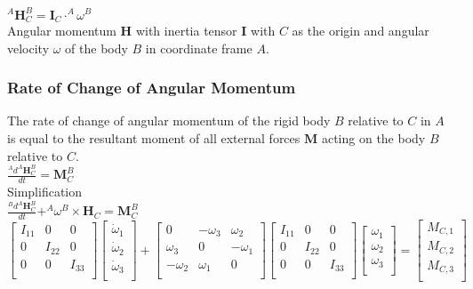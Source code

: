 $^A\mathbf{H}^B_C=\mathbf{I}_C\cdot^A\omega^B$
\\

Angular momentum $\mathbf{H}$ with inertia tensor $\mathbf{I}$ with $C$ as the origin and angular velocity $\omega$ of the body $B$ in coordinate frame $A$.

\subsubsection{Rate of Change of Angular Momentum}
The rate of change of angular momentum of the rigid body $B$ relative to $C$ in $A$ is equal to the resultant moment of all external forces $\mathbf{M}$ acting on the body $B$ relative to $C$.
\\

$\frac{^Ad^A\mathbf{H}^B_C}{dt}=\mathbf{M}_C^B$
\\

Simplification 
\\

$\frac{^Bd^A\mathbf{H}^B_C}{dt} + ^A\omega^B \times \mathbf{H}_C=\mathbf{M}_C^B$
\\

$\begin{bmatrix}
I_{11} & 0 & 0 \\
0 & I_{22} & 0 \\
0 & 0 & I_{33} \\
\end{bmatrix}
\begin{bmatrix}
\dot{\omega}_1 \\
\dot{\omega}_2 \\
\dot{\omega}_3 \\
\end{bmatrix}
+
\begin{bmatrix}
0 & -\omega_3 & \omega_2 \\
\omega_3 & 0 & -\omega_1 \\
-\omega_2 & \omega_1 & 0 \\
\end{bmatrix}
\begin{bmatrix}
I_{11} & 0 & 0 \\
0 & I_{22} & 0 \\
0 & 0 & I_{33} \\
\end{bmatrix}
\begin{bmatrix}
\omega_1 \\
\omega_2 \\
\omega_3 \\
\end{bmatrix}
=
\begin{bmatrix}
M_{C,1} \\
M_{C,2} \\
M_{C,3} \\
\end{bmatrix}
$
\\

